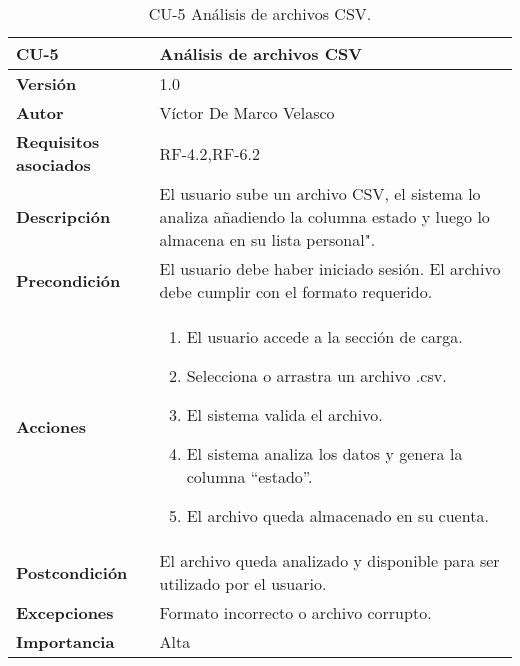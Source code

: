 \begin{table}[p]
	\centering
	\begin{tabularx}{\linewidth}{ p{} p{} }
		\toprule
		\textbf{CU-5}    & Análisis de archivos CSV \\
		\toprule
		\textbf{Versión}              & 1.0 \\
		\textbf{Autor}                & Víctor De Marco Velasco \\
		\textbf{Requisitos asociados} & RF-4.2,RF-6.2 \\
		\textbf{Descripción}          & El usuario sube un archivo CSV, el sistema lo analiza añadiendo la columna estado y luego lo almacena en su lista personal". \\
		\textbf{Precondición}         & El usuario debe haber iniciado sesión. El archivo debe cumplir con el formato requerido. \\
		\textbf{Acciones}             &
		\begin{enumerate}
			\item El usuario accede a la sección de carga.
			\item Selecciona o arrastra un archivo .csv.
			\item El sistema valida el archivo.
            \item El sistema analiza los datos y genera la columna “estado”.
			\item El archivo queda almacenado en su cuenta.
		\end{enumerate}\\
		\textbf{Postcondición}        & El archivo queda analizado y disponible para ser utilizado por el usuario. \\
		\textbf{Excepciones}          & Formato incorrecto o archivo corrupto. \\
		\textbf{Importancia}          & Alta \\
		\bottomrule
	\end{tabularx}
	\caption{CU-5 Análisis de archivos CSV.}
\end{table}


